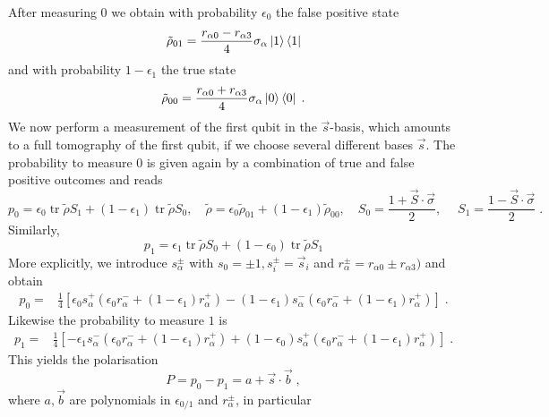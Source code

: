\documentclass[a4paper,twocolumn,11pt]{quantumarticle}
\begin{document}
After measuring $0$ we obtain with probability $\epsilon_0$  the false positive state
\begin{equation}
	\tilde \rho_{01}=\frac{r_{\alpha0}-r_{\alpha3}}{4} \sigma_\alpha \ket{1}\bra{1}
\end{equation}
and with probability $1-\epsilon_1$ the true state
\begin{equation}
	\tilde \rho_{00}=\frac{r_{\alpha0}+r_{\alpha3}}{4} \sigma_\alpha \ket{0}\bra{0}\;.
\end{equation}
We now perform a measurement of the first qubit in the $\vec s$-basis, which amounts to a full tomography of the first qubit, if we choose several different bases $\vec s$. The probability to measure $0$ is given again by a combination of true and false positive outcomes and reads
\begin{equation}
	p_0=\epsilon_0 \operatorname{tr} \tilde \rho S_1  +(1-\epsilon_1) \operatorname{tr} \tilde \rho S_0  , \quad \tilde \rho=\epsilon_0 \tilde \rho_{01}+(1-\epsilon_1) \tilde \rho_{00} , \quad S_0=\frac{1+\vec S \cdot \vec \sigma}{2}, \;\quad S_1=\frac{1-\vec S \cdot \vec \sigma}{2}\;.
	\end{equation} 
	Similarly,
	\begin{equation}
		p_1=\epsilon_1 \operatorname{tr} \tilde \rho S_0 + (1-\epsilon_0)\operatorname{tr} \tilde \rho S_1
	\end{equation}
	More explicitly, we introduce $s^\pm_\alpha$ with $s_0=\pm 1, s^\pm_i=\vec s_i$ and $r_\alpha^\pm=r_{\alpha0}\pm r_{\alpha 3})$ and obtain
\begin{equation}
\begin{aligned}
p_0=&	\frac{1}{4} [\epsilon_0s^+_\alpha (\epsilon_0r^-_{\alpha}+(1-\epsilon_1)r^+_{\alpha})  
-(1-\epsilon_1) s^-_\alpha(\epsilon_0r^-_{\alpha}+(1-\epsilon_1)r^+_{\alpha})  ]\;.
\end{aligned}
\end{equation}
Likewise the probability to measure $1$ is
\begin{equation}
\begin{aligned}
p_1=&	\frac{1}{4} [-\epsilon_1 s^-_\alpha(\epsilon_0r^-_{\alpha}+(1-\epsilon_1)r^+_{\alpha})
+(1-\epsilon_0) s^+_\alpha (\epsilon_0r^-_{\alpha}+(1-\epsilon_1)r^+_{\alpha})   ]\;.
\end{aligned}
\end{equation}
This yields the polarisation 
\begin{equation}
	P=p_0-p_1= a+ \vec s \cdot \vec b \;,
\end{equation}
where $a,\vec b$ are polynomials in $\epsilon_{0/1}$ and $r_\alpha^\pm$, in particular
\end{document}
